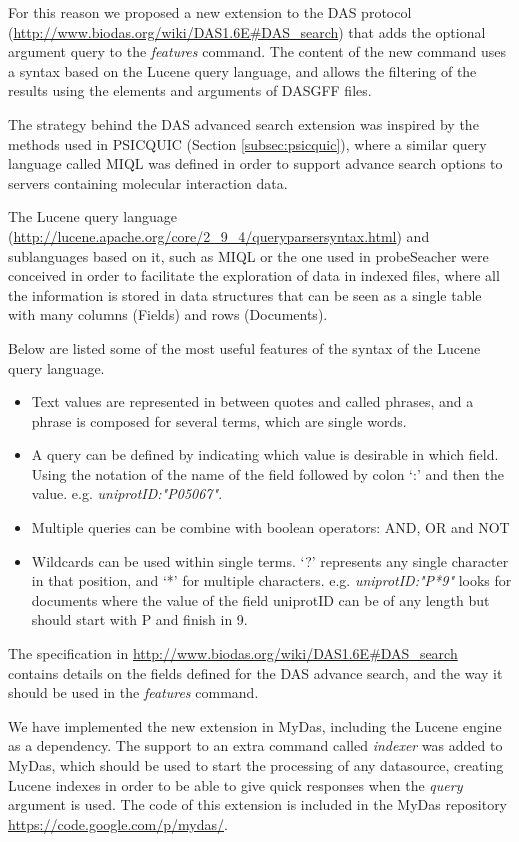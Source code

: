 For this reason we proposed a new extension to the DAS protocol (\url{http://www.biodas.org/wiki/DAS1.6E#DAS\_search}) that adds the optional argument query to the \emph{features} command. The content of the new command uses a syntax based on the Lucene query language, and allows the filtering of the results using the elements and arguments of DASGFF files.

The strategy behind the DAS advanced search extension was inspired by the methods used in PSICQUIC (Section \ref{subsec:psicquic}), where a similar query language called MIQL was defined in order to support advance search options to servers containing molecular interaction data. 

The Lucene query language (\url{http://lucene.apache.org/core/2_9_4/queryparsersyntax.html}) and sublanguages based on it, such as MIQL or the one used in probeSeacher were conceived in order to facilitate the exploration of data in indexed files, where all the information is stored in data structures that can be seen as a single table with many columns (Fields) and rows (Documents). 

Below are listed some of the most useful features of the syntax of the Lucene query language. 
\begin{itemize}
\setlength\itemsep{-0.3em}
 \item Text values are represented in between quotes and called phrases, and a phrase is composed for several terms, which are single words.
 \item A query can be defined by indicating which value is desirable in which field. Using the notation of the name of the field followed by colon `:' and then the value. e.g. \emph{uniprotID:"P05067"}.
 \item Multiple queries can be combine with boolean operators: AND, OR and NOT
 \item Wildcards can be used within single terms. `?' represents any single character in that position, and `*' for multiple characters. e.g. \emph{uniprotID:"P*9"} looks for documents where the value of the field uniprotID can be of any length but should start with P and finish in 9.
\end{itemize}

The specification in \url{http://www.biodas.org/wiki/DAS1.6E#DAS\_search} contains details on the fields defined for the DAS advance search, and the way it should be used in the \emph{features} command.

We have implemented the new extension in MyDas, including the Lucene engine as a dependency. The support to an extra command called \emph{indexer} was added to MyDas, which should be used to start the processing of any datasource, creating Lucene indexes in order to be able to give quick responses when the \emph{query} argument is used. The code of this extension is included in the MyDas repository \url{https://code.google.com/p/mydas/}.


